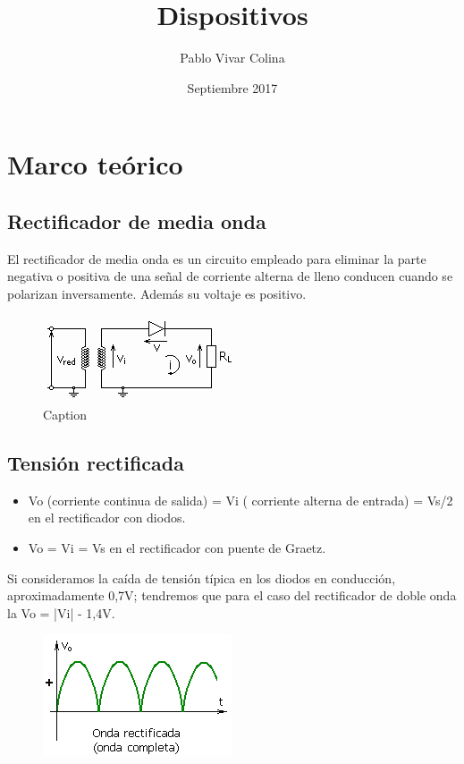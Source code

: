 \documentclass{article}
\title{Dispositivos}
\author{Pablo Vivar Colina}
\date{Septiembre 2017}
\begin{document}


\section{Marco teórico}

\subsection{Rectificador de media onda}

El rectificador de media onda es un circuito empleado para eliminar la parte negativa o positiva de una señal de corriente alterna de lleno conducen cuando se polarizan inversamente. Además su voltaje es positivo.\citep{circuitoMediaOnda}

\begin{figure}[h!]
    \centering
    \includegraphics{Circuito_rectificador_media_onda.png}
    \caption{Caption}
    \label{fig:rectificadorMedia}
\end{figure}

\subsection{Tensión rectificada}

\begin{itemize}
    \item  Vo (corriente continua de salida) = Vi ( corriente alterna de entrada) = Vs/2 en el rectificador con diodos.
    \item  Vo = Vi = Vs en el rectificador con puente de Graetz.
\end{itemize}

   

Si consideramos la caída de tensión típica en los diodos en conducción, aproximadamente 0,7V; tendremos que para el caso del rectificador de doble onda la Vo = |Vi| - 1,4V.\citep{circuitoOnda}\\


\begin{figure}[h!]
    \centering
    \includegraphics[scale=0.8]{OndaCompleta.png}
    \label{fig:my_label}
\end{figure}
\end{document}
